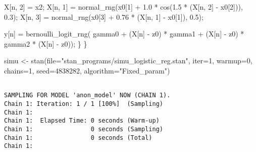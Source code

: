 \documentclass[
  letterpaper,
  DIV=11,
  numbers=noendperiod]{scrartcl}
\newenvironment{Shaded}{\begin{snugshade}}{\end{snugshade}}
\newcommand{\AttributeTok}[1]{\textcolor[rgb]{0.40,0.45,0.13}{#1}}
\newcommand{\DecValTok}[1]{\textcolor[rgb]{0.68,0.00,0.00}{#1}}
\newcommand{\FloatTok}[1]{\textcolor[rgb]{0.68,0.00,0.00}{#1}}
\newcommand{\FunctionTok}[1]{\textcolor[rgb]{0.28,0.35,0.67}{#1}}
\newcommand{\NormalTok}[1]{\textcolor[rgb]{0.00,0.23,0.31}{#1}}
\newcommand{\OtherTok}[1]{\textcolor[rgb]{0.00,0.23,0.31}{#1}}
\newcommand{\SpecialCharTok}[1]{\textcolor[rgb]{0.37,0.37,0.37}{#1}}
\newcommand{\StringTok}[1]{\textcolor[rgb]{0.13,0.47,0.30}{#1}}
\begin{document}
\begin{codelisting}
\begin{Shaded}
\begin{Highlighting}[]
\NormalTok{    X[n, }\DecValTok{2}\NormalTok{] = x2;}
\NormalTok{    X[n, }\DecValTok{1}\NormalTok{] = normal\_rng(x0[}\DecValTok{1}\NormalTok{] + }\FloatTok{1.0}\NormalTok{ * cos(}\FloatTok{1.5}\NormalTok{ * (X[n, }\DecValTok{2}\NormalTok{] {-} x0[}\DecValTok{2}\NormalTok{])), }\FloatTok{0.3}\NormalTok{);}
\NormalTok{    X[n, }\DecValTok{3}\NormalTok{] = normal\_rng(x0[}\DecValTok{3}\NormalTok{] + }\FloatTok{0.76}\NormalTok{ * (X[n, }\DecValTok{1}\NormalTok{] {-} x0[}\DecValTok{1}\NormalTok{]), }\FloatTok{0.5}\NormalTok{);}

\NormalTok{    y[n] = bernoulli\_logit\_rng(  gamma0 }
\NormalTok{                               + (X[n] {-} z0\textquotesingle{}) * gamma1}
\NormalTok{                               + (X[n] {-} z0\textquotesingle{}) * gamma2 * (X[n] {-} z0\textquotesingle{})\textquotesingle{});}
\NormalTok{  \}}
\NormalTok{\}}
\end{Highlighting}
\end{Shaded}

\end{codelisting}

\begin{Shaded}
\begin{Highlighting}[]
\NormalTok{simu }\OtherTok{\textless{}{-}} \FunctionTok{stan}\NormalTok{(}\AttributeTok{file=}\StringTok{"stan\_programs/simu\_logistic\_reg.stan"}\NormalTok{,}
             \AttributeTok{iter=}\DecValTok{1}\NormalTok{, }\AttributeTok{warmup=}\DecValTok{0}\NormalTok{, }\AttributeTok{chains=}\DecValTok{1}\NormalTok{,}
             \AttributeTok{seed=}\DecValTok{4838282}\NormalTok{, }\AttributeTok{algorithm=}\StringTok{"Fixed\_param"}\NormalTok{)}
\end{Highlighting}
\end{Shaded}

\begin{verbatim}

SAMPLING FOR MODEL 'anon_model' NOW (CHAIN 1).
Chain 1: Iteration: 1 / 1 [100%]  (Sampling)
Chain 1: 
Chain 1:  Elapsed Time: 0 seconds (Warm-up)
Chain 1:                0 seconds (Sampling)
Chain 1:                0 seconds (Total)
Chain 1: 
\end{verbatim}

\begin{Shaded}
\end{Shaded}
\end{document}
